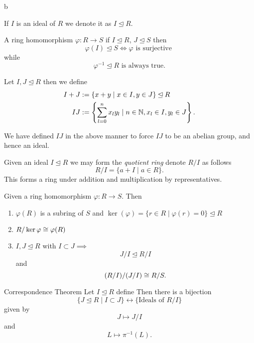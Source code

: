 b\documentclass[master.tex]{subfiles}
\begin{document}
\begin{notation}
  If \(I\) is an ideal of \(R\) we denote it as \(I \unlhd R\).
\end{notation}

\begin{prop}
  A ring homomorphism \(\varphi \colon R \to S\) if \(I \unlhd R\), \(J \unlhd S\) then
  \[\varphi(I) \unlhd S \iff \varphi \text{ is surjective }\]
  while
  \[\varphi^{-1} \unlhd R \text{ is always true.}\]
\end{prop}

\begin{defn*}
  Let \(I,J \unlhd R\) then we define
  \begin{align*}
    I+J &:= \{x+y \mid x \in I, y \in J\} \unlhd R\\
    IJ  &:= \left\{\sum_{l=0}^nx_l y_l \mid n \in {\mathbb N}, x_l \in I, y_l \in J\right\}.
  \end{align*}
\end{defn*}
We have defined \(IJ\) in the above manner to force \(IJ\) to be an abelian group, and hence an ideal.

\begin{defn*}
  Given an ideal \(I \unlhd R\) we may form the \emph{quotient ring} denote \(R/I\) as follows
  \[R/I = \{a+I\mid a \in R\}.\] This forms a ring under addition and multiplication by representatives.
\end{defn*}

\begin{thm} Given a ring homomorphism \(\varphi \colon R \to S\). Then
  \begin{enumerate}[label=(\alph*)]
  \item \(\varphi(R)\) is a subring of \(S\) and \(\ker(\varphi)=\{r \in R \mid \varphi(r)=0\} \unlhd R\)
  \item \(R/\ker \varphi \mathrel{\cong} \varphi(R)\)
  \item \(I,J \unlhd R\) with \(I \subset J \implies\)
    \[J/I\unlhd R/I\] and
    \[(R/I)/(J/I) \mathrel{\cong} R/S.\]
  \end{enumerate}
\end{thm}

\begin{prop}{Correspondence Theorem}
  Let \(I \unlhd R\) define  Then there is a bijection
  \[\{J \unlhd R \mid I \subset J\} \longleftrightarrow \{\text{Ideals of } R/I \}\] given by
  \[J \longmapsto J/I\] and
  \[L \longmapsto \pi^{-1}(L).\]
\end{prop}
\end{document}
